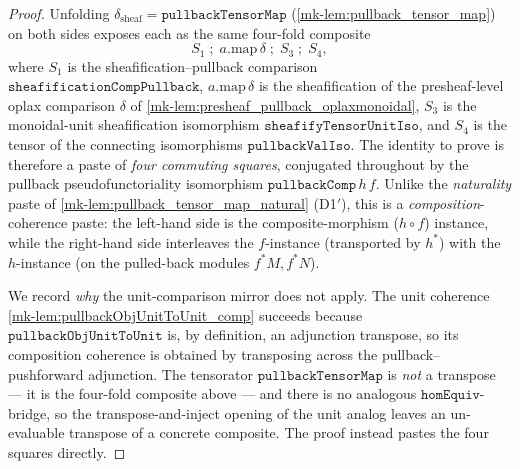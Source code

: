 \begin{proof}
  \leanok
  Unfolding \(\delta_{\mathrm{sheaf}} = \mathtt{pullbackTensorMap}\)
  (\ref{mk-lem:pullback_tensor_map}) on both sides exposes each as the same four-fold
  composite
  \[
    S_1 \;\mathbin{;}\; a.\mathrm{map}\,\delta \;\mathbin{;}\; S_3 \;\mathbin{;}\; S_4,
  \]
  where \(S_1\) is the sheafification--pullback comparison
  \(\mathtt{sheafificationCompPullback}\), \(a.\mathrm{map}\,\delta\) is the
  sheafification of the presheaf-level oplax comparison \(\delta\) of
  \ref{mk-lem:presheaf_pullback_oplaxmonoidal}, \(S_3\) is the monoidal-unit
  sheafification isomorphism \(\mathtt{sheafifyTensorUnitIso}\), and \(S_4\) is the
  tensor of the connecting isomorphisms \(\mathtt{pullbackValIso}\). The identity to
  prove is therefore a paste of \emph{four commuting squares}, conjugated throughout by
  the pullback pseudofunctoriality isomorphism \(\mathtt{pullbackComp}\,h\,f\). Unlike
  the \emph{naturality} paste of \ref{mk-lem:pullback_tensor_map_natural} (D1$'$), this is
  a \emph{composition}-coherence paste: the left-hand side is the composite-morphism
  (\(h \circ f\)) instance, while the right-hand side interleaves the \(f\)-instance
  (transported by \(h^{*}\)) with the \(h\)-instance (on the pulled-back modules
  \(f^{*}M, f^{*}N\)).

  We record \emph{why} the unit-comparison mirror does not apply. The unit coherence
  \ref{mk-lem:pullbackObjUnitToUnit_comp} succeeds because
  \(\mathtt{pullbackObjUnitToUnit}\) is, by definition, an adjunction transpose, so its
  composition coherence is obtained by transposing across the pullback--pushforward
  adjunction. The tensorator \(\mathtt{pullbackTensorMap}\) is \emph{not} a transpose ---
  it is the four-fold composite above --- and there is no analogous
  \(\mathtt{homEquiv}\)-bridge, so the transpose-and-inject opening of the unit analog
  leaves an un-evaluable transpose of a concrete composite. The proof instead
  pastes the four squares directly.


\end{proof}
